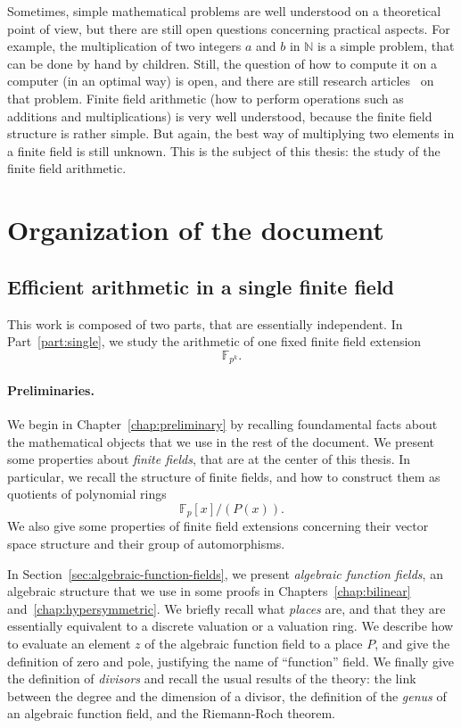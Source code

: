 Sometimes, simple mathematical problems are well understood on a theoretical
point of view, but there are still open questions concerning practical aspects.
For example, the multiplication of two integers $a$ and $b$ in $\mathbb{N}$ is a
simple problem, that can be done by hand by children. Still, the question of how
to compute it on a computer (in an optimal way) is open, and there are still
research articles~\cite{HVDH19} on that problem.
Finite field arithmetic (\ie how to perform operations such as additions and
multiplications) is very well understood, because the finite field structure is
rather simple. But again, the best way of multiplying two elements in a finite
field is still unknown. This is the subject of this thesis: the study of the
finite field arithmetic.

\section{Organization of the document}
\subsection{Efficient arithmetic in a single finite field}

This work is composed of two parts, that are essentially independent. In
Part~\ref{part:single}, we study the arithmetic of one fixed finite field
extension
\[
  \mathbb{F}_{p^k}.
\]
\paragraph{Preliminaries.} We begin in Chapter~\ref{chap:preliminary} by
recalling foundamental
facts about the mathematical objects that we use in the rest of the document. We
present some properties about \emph{finite fields}, that are at the center of
this thesis. In particular, we recall the structure of finite fields, and how to
construct them as quotients of polynomial rings
\[
  \mathbb{F}_p[x]/(P(x)).
\]
We also give some properties of finite field extensions concerning their vector
space structure and their group of automorphisms.

In Section~\ref{sec:algebraic-function-fields}, we present \emph{algebraic
function fields}, an algebraic structure that we use in some proofs in
Chapters~\ref{chap:bilinear} and~\ref{chap:hypersymmetric}. We briefly recall
what \emph{places} are, and that they are essentially equivalent to a discrete
valuation or a valuation ring. We describe how to evaluate an element
$z$ of the algebraic function field to a place $P$, and give the definition of
zero and pole, justifying the name of ``function'' field. We finally give the
definition of \emph{divisors} and recall the usual results of the theory: the
link between the degree and the dimension of a divisor, the definition of the
\emph{genus} of an algebraic function field, and the Riemann-Roch theorem.

